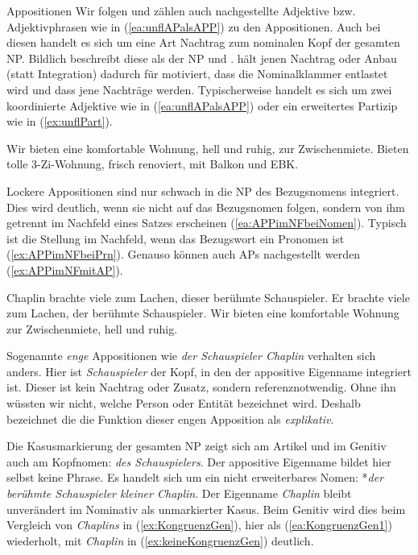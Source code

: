 \begin{Exkurs}{Appositionen}
Wir folgen \citet[2037]{ZifHoffStr1997} und zählen auch nachgestellte Adjektive bzw. Adjektivphrasen wie in (\ref{ea:unflAPalsAPP}) zu den Appositionen. Auch bei diesen handelt es sich um eine Art Nachtrag zum nominalen Kopf der gesamten NP. Bildlich beschreibt \citet[777]{Agel2017} diese als  der NP und . \citet[531]{Weinrich2003} hält jenen Nachtrag oder Anbau (statt Integration) dadurch für motiviert, dass die Nominalklammer entlastet wird und dass jene Nachträge  werden. Typischerweise handelt es sich um zwei koordinierte Adjektive wie in (\ref{ea:unflAPalsAPP}) oder ein erweitertes Partizip wie in (\ref{ex:unflPart}).

\ea \label{ea:nachgestellte AP}
\ea \label{ea:unflAPalsAPP} Wir bieten eine komfortable Wohnung, hell und ruhig, zur Zwischenmiete.
\ex \label{ex:unflPart} Bieten tolle 3-Zi-Wohnung, frisch renoviert, mit Balkon und EBK.
\z
\z 

Lockere Appositionen sind nur schwach in die NP des Bezugsnomens integriert. Dies wird deutlich, wenn sie nicht auf das Bezugsnomen folgen, sondern von ihm getrennt im Nachfeld eines Satzes erscheinen (\ref{ea:APPimNFbeiNomen}). Typisch ist die Stellung im Nachfeld, wenn das Bezugswort ein Pronomen ist (\ref{ex:APPimNFbeiPrn}). Genauso können auch APs nachgestellt werden (\ref{ex:APPimNFmitAP}).

\ea \label{ea:APPimNF}
\ea \label{ea:APPimNFbeiNomen} Chaplin brachte viele zum Lachen, dieser berühmte Schauspieler.
\ex \label{ex:APPimNFbeiPrn} Er brachte viele zum Lachen, der berühmte Schauspieler.
\ex \label{ex:APPimNFmitAP} Wir bieten eine komfortable Wohnung zur Zwischenmiete, hell und ruhig. 
\z 
\z 

Sogenannte \textit{enge} Appositionen wie \textit{der Schauspieler Chaplin} verhalten sich anders. Hier ist \textit{Schauspieler} der Kopf, in den der appositive Eigenname integriert ist. Dieser ist kein Nachtrag oder Zusatz, sondern referenznotwendig. Ohne ihn wüssten wir nicht, welche Person oder Entität bezeichnet wird. Deshalb bezeichnet die \citet[448, §737]{Duden2022} die Funktion dieser engen Apposition als \textit{explikativ}. 

Die Kasusmarkierung der gesamten NP zeigt sich am Artikel und im Genitiv auch am Kopfnomen: \textit{des Schauspielers}. Der appositive Eigenname bildet hier selbst keine Phrase. Es handelt sich um ein nicht erweiterbares Nomen: *\textit{der berühmte Schauspieler kleiner Chaplin}. Der Eigenname \textit{Chaplin} bleibt unverändert im Nominativ als unmarkierter Kasus. Beim Genitiv wird dies beim Vergleich von \textit{Chaplins} in (\ref{ex:KongruenzGen}), hier als (\ref{ea:KongruenzGen1}) wiederholt, mit \textit{Chaplin} in (\ref{ex:keineKongruenzGen}) deutlich.


\end{Exkurs}
